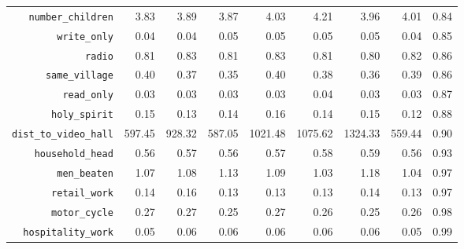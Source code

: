 \begin{longtable}{rrrrrrrrr}
  {\texttt{number\_children}} & 3.83 & 3.89 & 3.87 & 4.03 & 4.21 & 3.96 & 4.01 & 0.84 \\ 
  {\texttt{write\_only}} & 0.04 & 0.04 & 0.05 & 0.05 & 0.05 & 0.05 & 0.04 & 0.85 \\ 
  {\texttt{radio}} & 0.81 & 0.83 & 0.81 & 0.83 & 0.81 & 0.80 & 0.82 & 0.86 \\ 
  {\texttt{same\_village}} & 0.40 & 0.37 & 0.35 & 0.40 & 0.38 & 0.36 & 0.39 & 0.86 \\ 
  {\texttt{read\_only}} & 0.03 & 0.03 & 0.03 & 0.03 & 0.04 & 0.03 & 0.03 & 0.87 \\ 
  {\texttt{holy\_spirit}} & 0.15 & 0.13 & 0.14 & 0.16 & 0.14 & 0.15 & 0.12 & 0.88 \\ 
  {\texttt{dist\_to\_video\_hall}} & 597.45 & 928.32 & 587.05 & 1021.48 & 1075.62 & 1324.33 & 559.44 & 0.90 \\ 
  {\texttt{household\_head}} & 0.56 & 0.57 & 0.56 & 0.57 & 0.58 & 0.59 & 0.56 & 0.93 \\ 
  {\texttt{men\_beaten}} & 1.07 & 1.08 & 1.13 & 1.09 & 1.03 & 1.18 & 1.04 & 0.97 \\ 
  {\texttt{retail\_work}} & 0.14 & 0.16 & 0.13 & 0.13 & 0.13 & 0.14 & 0.13 & 0.97 \\ 
  {\texttt{motor\_cycle}} & 0.27 & 0.27 & 0.25 & 0.27 & 0.26 & 0.25 & 0.26 & 0.98 \\ 
  {\texttt{hospitality\_work}} & 0.05 & 0.06 & 0.06 & 0.06 & 0.06 & 0.06 & 0.05 & 0.99 \\ 
   \hline
\hline
\end{longtable}
